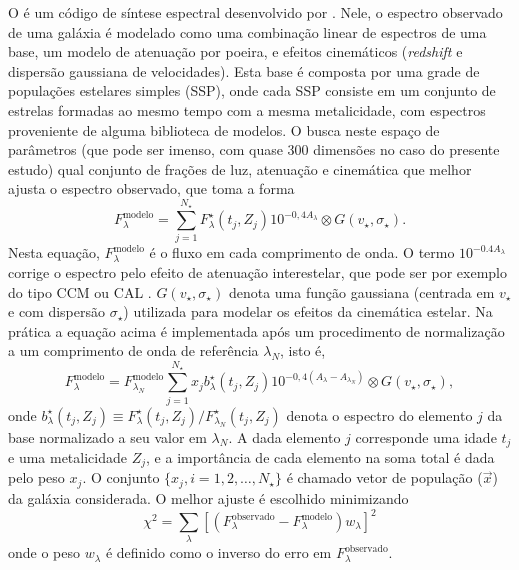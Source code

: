 O \starlight é um código de síntese espectral desenvolvido por
\citet{CidFernandes2005}. Nele, o espectro observado de uma galáxia é modelado
como uma combinação linear de espectros de uma base, um modelo de atenuação por
poeira, e efeitos cinemáticos ({\em redshift} e dispersão gaussiana de
velocidades). Esta base é composta por uma grade de populações estelares simples
(SSP), onde cada SSP consiste em um conjunto de estrelas formadas ao mesmo tempo
com a mesma metalicidade, com espectros proveniente de alguma biblioteca de
modelos. O \starlight busca neste espaço de parâmetros (que pode ser imenso, com
quase 300 dimensões no caso do presente estudo) qual conjunto de frações de luz,
atenuação e cinemática que melhor ajusta o espectro observado, que toma a forma
\begin{equation*}
F^{\mathrm{modelo}}_\lambda = \sum_{j=1}^{N_\star} F^\star_\lambda(t_j,Z_j)
10^{ -0,4 A_\lambda}  \otimes G(v_\star,\sigma_\star).
\end{equation*}	
Nesta equação, $F^{\mathrm{modelo}}_\lambda$ é o fluxo em cada comprimento de
onda. O termo $10^{ -0.4 A_\lambda}$ corrige o espectro pelo efeito de atenuação
interestelar, que pode ser por exemplo do tipo CCM \citep*{Cardelli1989} ou
CAL \citep*{Calzetti1994}. $G(v_\star,\sigma_\star)$ denota uma função
gaussiana (centrada em $v_\star$ e com dispersão $\sigma_\star$) utilizada para
modelar os efeitos da cinemática estelar. Na prática a equação acima é
implementada após um procedimento de normalização a um comprimento de onda de
referência $\lambda_N$, isto é,
\begin{equation*}
F^{\mathrm{modelo}}_\lambda = F^{\mathrm{modelo}}_{\lambda_N} 
\sum_{j=1}^{N_\star} x_j b^\star_\lambda(t_j,Z_j)
10^{ -0,4 (A_\lambda - A_{\lambda_N}) } \otimes G(v_\star,\sigma_\star),
\end{equation*}
onde $b^\star_\lambda(t_j,Z_j) \equiv  F^\star_\lambda(t_j,Z_j) /
F^\star_{\lambda_N}(t_j,Z_j)$ denota o espectro  do elemento $j$ da base
normalizado a seu valor em $\lambda_N$. A dada elemento $j$ corresponde uma
idade  $t_j$ e uma metalicidade $Z_j$, e a importância de cada elemento na soma
total é dada pelo peso $x_j$. O conjunto $\{x_j, i=1,2,\ldots,N_\star\}$ é
chamado vetor de população ($\vec{x}$) da galáxia considerada.
O melhor ajuste é escolhido minimizando
\begin{equation*}
\chi^2 = \sum_\lambda \left[(F^{\mathrm{observado}}_\lambda -
F^{\mathrm{modelo}}_\lambda) w_\lambda\right]^2
\end{equation*}
onde o peso $w_\lambda$ é definido como o inverso do erro em
$F_\lambda^{\mathrm{observado}}$.


